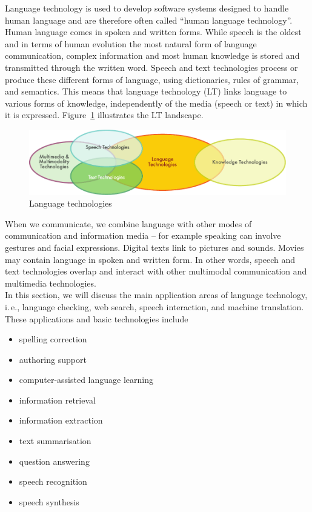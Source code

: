 \begin{multicols}{2}

Language technology is used to develop software systems designed to handle human language and are therefore often called “human language technology”. Human language comes in spoken and written forms. While speech is the oldest and in terms of human evolution the most natural form of language communication, complex information and most human knowledge is stored and transmitted through the written word. Speech and text technologies process or produce these different forms of language, using dictionaries, rules of grammar, and semantics. This means that language technology (LT) links language to various forms of knowledge, independently of the media (speech or text) in which it is expressed. Figure~\ref{fig:ltincontext_en} illustrates the LT landscape.

\begin{figure}[htb]
  \center
  \includegraphics[width=\textwidth]{../_media/english/language_technologies}
  \caption{Language technologies}
  \label{fig:ltincontext_en}
\end{figure}

When we communicate, we combine language with other modes of communication and information media – for example speaking can involve gestures and facial expressions. Digital texts link to pictures and sounds. Movies may contain language in spoken and written form. In other words, speech and text technologies overlap and interact with other multimodal communication and multimedia technologies.\\ 
In this section, we will discuss the main application areas of language technology, i.\,e., language checking, web search, speech interaction, and machine translation. These applications and basic technologies include 

\begin{itemize}
\item spelling correction
\item authoring support
\item computer-assisted language learning
\item information retrieval 
\item information extraction
\item text summarisation
\item question answering
\item speech recognition 
\item speech synthesis 
\end{itemize}


\end{multicols}
